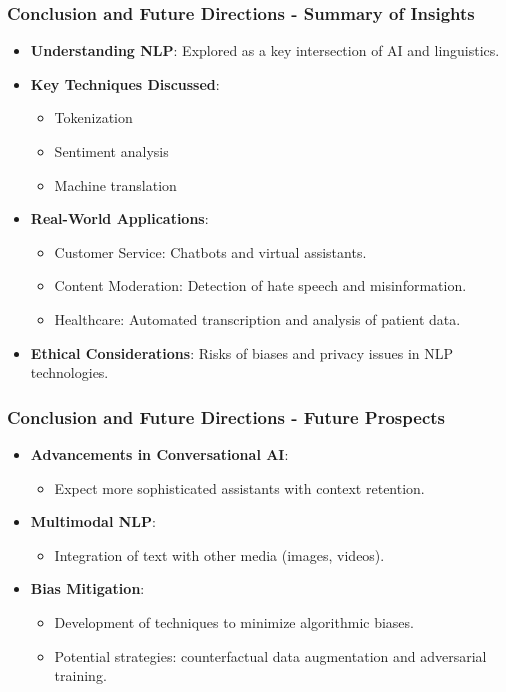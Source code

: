 \documentclass{beamer}
\begin{document}
\begin{frame}[fragile]
    \frametitle{Conclusion and Future Directions - Summary of Insights}
    \begin{itemize}
        \item \textbf{Understanding NLP}: Explored as a key intersection of AI and linguistics.
        \item \textbf{Key Techniques Discussed}:
            \begin{itemize}
                \item Tokenization
                \item Sentiment analysis
                \item Machine translation
            \end{itemize}
        \item \textbf{Real-World Applications}:
            \begin{itemize}
                \item Customer Service: Chatbots and virtual assistants.
                \item Content Moderation: Detection of hate speech and misinformation.
                \item Healthcare: Automated transcription and analysis of patient data.
            \end{itemize}
        \item \textbf{Ethical Considerations}: Risks of biases and privacy issues in NLP technologies.
    \end{itemize}
\end{frame}

\begin{frame}[fragile]
    \frametitle{Conclusion and Future Directions - Future Prospects}
    \begin{itemize}
        \item \textbf{Advancements in Conversational AI}: 
            \begin{itemize}
                \item Expect more sophisticated assistants with context retention.
            \end{itemize}
        \item \textbf{Multimodal NLP}: 
            \begin{itemize}
                \item Integration of text with other media (images, videos).
            \end{itemize}
        \item \textbf{Bias Mitigation}: 
            \begin{itemize}
                \item Development of techniques to minimize algorithmic biases.
                \item Potential strategies: counterfactual data augmentation and adversarial training.
            \end{itemize}
    \end{itemize}
\end{frame}
\end{document}
